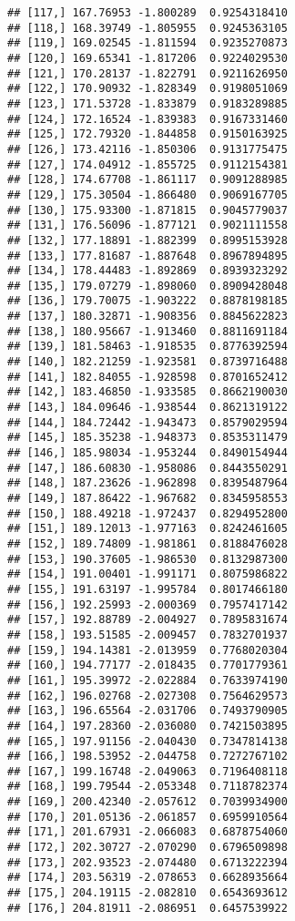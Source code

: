 \documentclass[]{book}
\theoremstyle{definition}
\theoremstyle{definition}
\theoremstyle{definition}
\theoremstyle{remark}
\begin{document}
\begin{verbatim}
## [117,] 167.76953 -1.800289  0.9254318410
## [118,] 168.39749 -1.805955  0.9245363105
## [119,] 169.02545 -1.811594  0.9235270873
## [120,] 169.65341 -1.817206  0.9224029530
## [121,] 170.28137 -1.822791  0.9211626950
## [122,] 170.90932 -1.828349  0.9198051069
## [123,] 171.53728 -1.833879  0.9183289885
## [124,] 172.16524 -1.839383  0.9167331460
## [125,] 172.79320 -1.844858  0.9150163925
## [126,] 173.42116 -1.850306  0.9131775475
## [127,] 174.04912 -1.855725  0.9112154381
## [128,] 174.67708 -1.861117  0.9091288985
## [129,] 175.30504 -1.866480  0.9069167705
## [130,] 175.93300 -1.871815  0.9045779037
## [131,] 176.56096 -1.877121  0.9021111558
## [132,] 177.18891 -1.882399  0.8995153928
## [133,] 177.81687 -1.887648  0.8967894895
## [134,] 178.44483 -1.892869  0.8939323292
## [135,] 179.07279 -1.898060  0.8909428048
## [136,] 179.70075 -1.903222  0.8878198185
## [137,] 180.32871 -1.908356  0.8845622823
## [138,] 180.95667 -1.913460  0.8811691184
## [139,] 181.58463 -1.918535  0.8776392594
## [140,] 182.21259 -1.923581  0.8739716488
## [141,] 182.84055 -1.928598  0.8701652412
## [142,] 183.46850 -1.933585  0.8662190030
## [143,] 184.09646 -1.938544  0.8621319122
## [144,] 184.72442 -1.943473  0.8579029594
## [145,] 185.35238 -1.948373  0.8535311479
## [146,] 185.98034 -1.953244  0.8490154944
## [147,] 186.60830 -1.958086  0.8443550291
## [148,] 187.23626 -1.962898  0.8395487964
## [149,] 187.86422 -1.967682  0.8345958553
## [150,] 188.49218 -1.972437  0.8294952800
## [151,] 189.12013 -1.977163  0.8242461605
## [152,] 189.74809 -1.981861  0.8188476028
## [153,] 190.37605 -1.986530  0.8132987300
## [154,] 191.00401 -1.991171  0.8075986822
## [155,] 191.63197 -1.995784  0.8017466180
## [156,] 192.25993 -2.000369  0.7957417142
## [157,] 192.88789 -2.004927  0.7895831674
## [158,] 193.51585 -2.009457  0.7832701937
## [159,] 194.14381 -2.013959  0.7768020304
## [160,] 194.77177 -2.018435  0.7701779361
## [161,] 195.39972 -2.022884  0.7633974190
## [162,] 196.02768 -2.027308  0.7564629573
## [163,] 196.65564 -2.031706  0.7493790905
## [164,] 197.28360 -2.036080  0.7421503895
## [165,] 197.91156 -2.040430  0.7347814138
## [166,] 198.53952 -2.044758  0.7272767102
## [167,] 199.16748 -2.049063  0.7196408118
## [168,] 199.79544 -2.053348  0.7118782374
## [169,] 200.42340 -2.057612  0.7039934900
## [170,] 201.05136 -2.061857  0.6959910564
## [171,] 201.67931 -2.066083  0.6878754060
## [172,] 202.30727 -2.070290  0.6796509898
## [173,] 202.93523 -2.074480  0.6713222394
## [174,] 203.56319 -2.078653  0.6628935664
## [175,] 204.19115 -2.082810  0.6543693612
## [176,] 204.81911 -2.086951  0.6457539922

\end{verbatim}
\end{document}

